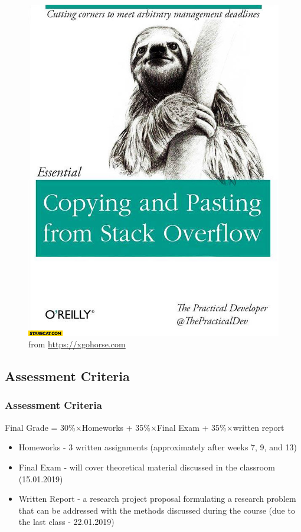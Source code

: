\begin{frame}
\begin{overprint}
\begin{figure}
                \includegraphics[scale = .175]{png/copy_paste.png}
                \caption{from \href{https://xgohorse.com}{https://xgohorse.com}}
            \end{figure}
    \end{overprint}
\end{frame}

\subsection[Assessment]{Assessment Criteria}
\begin{frame}
    \frametitle{Assessment Criteria}
    \begin{block}{}
        Final Grade = 30\%$\times$Homeworks + 35\%$\times$Final Exam + 35\%$\times$written report\\
    \end{block}
        \begin{itemize}
        \item Homeworks - 3 written assignments (approximately after weeks 7, 9, and 13)
        \item Final Exam - will cover theoretical material discussed in the classroom (15.01.2019)
        \item Written Report - a research project proposal formulating a research problem that can be addressed with the methods discussed during the course (due to the last class - 22.01.2019)
    \end{itemize}
\end{frame}

